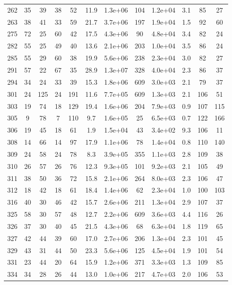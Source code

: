 \begin{table}
\begin{tabular}{cccccccccccc}
262 & 35 & 39 & 38 & 52 & 11.9 & 1.3e+06 & 104 & 1.2e+04 & 3.1 & 85 & 27 \\
263 & 38 & 41 & 33 & 59 & 21.7 & 3.7e+06 & 197 & 1.9e+04 & 1.5 & 92 & 60 \\
275 & 72 & 25 & 60 & 42 & 17.5 & 4.3e+06 & 90 & 4.8e+04 & 3.4 & 82 & 24 \\
282 & 55 & 25 & 49 & 40 & 13.6 & 2.1e+06 & 203 & 1.0e+04 & 3.5 & 86 & 24 \\
285 & 55 & 29 & 60 & 38 & 19.9 & 5.6e+06 & 238 & 2.3e+04 & 3.0 & 82 & 27 \\
291 & 57 & 22 & 67 & 35 & 28.9 & 1.3e+07 & 328 & 4.0e+04 & 2.3 & 86 & 37 \\
294 & 34 & 24 & 33 & 39 & 15.3 & 1.8e+06 & 609 & 3.0e+03 & 2.1 & 79 & 37 \\
301 & 24 & 125 & 24 & 191 & 11.6 & 7.7e+05 & 609 & 1.3e+03 & 2.1 & 106 & 51 \\
303 & 19 & 74 & 18 & 129 & 19.4 & 1.6e+06 & 204 & 7.9e+03 & 0.9 & 107 & 115 \\
305 & 9 & 78 & 7 & 110 & 9.7 & 1.6e+05 & 25 & 6.5e+03 & 0.7 & 122 & 166 \\
306 & 19 & 45 & 18 & 61 & 1.9 & 1.5e+04 & 43 & 3.4e+02 & 9.3 & 106 & 11 \\
308 & 14 & 66 & 14 & 97 & 17.9 & 1.1e+06 & 78 & 1.4e+04 & 0.8 & 110 & 140 \\
309 & 24 & 58 & 24 & 78 & 8.3 & 3.9e+05 & 355 & 1.1e+03 & 2.8 & 109 & 38 \\
310 & 26 & 57 & 26 & 76 & 12.3 & 9.3e+05 & 101 & 9.2e+03 & 2.1 & 105 & 49 \\
311 & 38 & 50 & 36 & 72 & 15.8 & 2.1e+06 & 264 & 8.0e+03 & 2.3 & 106 & 47 \\
312 & 18 & 42 & 18 & 61 & 18.4 & 1.4e+06 & 62 & 2.3e+04 & 1.0 & 100 & 103 \\
316 & 40 & 30 & 46 & 42 & 15.7 & 2.6e+06 & 211 & 1.3e+04 & 2.9 & 107 & 37 \\
325 & 58 & 30 & 57 & 48 & 12.7 & 2.2e+06 & 609 & 3.6e+03 & 4.4 & 116 & 26 \\
326 & 37 & 30 & 40 & 45 & 21.5 & 4.3e+06 & 68 & 6.3e+04 & 1.8 & 119 & 65 \\
327 & 42 & 44 & 39 & 60 & 17.0 & 2.7e+06 & 206 & 1.3e+04 & 2.3 & 101 & 45 \\
329 & 43 & 31 & 44 & 50 & 23.3 & 5.6e+06 & 125 & 4.5e+04 & 1.9 & 101 & 54 \\
331 & 23 & 44 & 20 & 64 & 15.9 & 1.2e+06 & 371 & 3.3e+03 & 1.3 & 109 & 85 \\
334 & 34 & 28 & 26 & 44 & 13.0 & 1.0e+06 & 217 & 4.7e+03 & 2.0 & 106 & 53 \\

\end{tabular}
\end{table}
